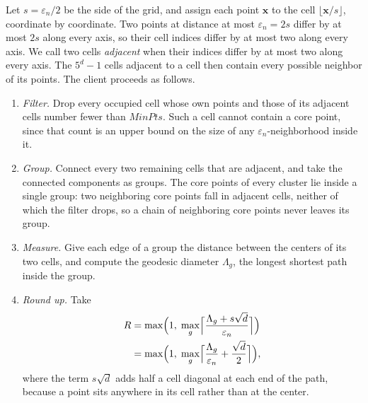 Let $s = \varepsilon_n / 2$ be the side of the grid, and assign each
point $\mathbf{x}$ to the cell $\lfloor \mathbf{x} / s \rfloor$,
coordinate by coordinate. Two points at distance at most
$\varepsilon_n = 2s$ differ by at most $2s$ along every axis, so their
cell indices differ by at most two along every axis. We call two cells
\emph{adjacent} when their indices differ by at most two along every
axis. The $5^d - 1$ cells adjacent to a cell then contain every possible
neighbor of its points. The client proceeds as follows.

\begin{enumerate}
\item \emph{Filter.} Drop every occupied cell whose own points and those
  of its adjacent cells number fewer than $\mathit{MinPts}$. Such a cell
  cannot contain a core point, since that count is an upper bound on the
  size of any $\varepsilon_n$-neighborhood inside it.
\item \emph{Group.} Connect every two remaining cells that are adjacent,
  and take the connected components as groups. The core points of every
  cluster lie inside a single group: two neighboring core points fall in
  adjacent cells, neither of which the filter drops, so a chain of
  neighboring core points never leaves its group.
\item \emph{Measure.} Give each edge of a group the distance between the
  centers of its two cells, and compute the geodesic diameter
  $\Lambda_g$, the longest shortest path inside the group.
\item \emph{Round up.} Take
  \begin{align*}
    R &= \max\Bigl(1, \; \max_{g}
      \Bigl\lceil \frac{\Lambda_g + s\sqrt{d}}{\varepsilon_n}
      \Bigr\rceil \Bigr) \\
      &= \max\Bigl(1, \; \max_{g}
      \Bigl\lceil \frac{\Lambda_g}{\varepsilon_n}
        + \frac{\sqrt{d}}{2} \Bigr\rceil \Bigr),
  \end{align*}
  where the term $s\sqrt{d}$ adds half a cell diagonal at each end of
  the path, because a point sits anywhere in its cell rather than at the
  center.
\end{enumerate}

